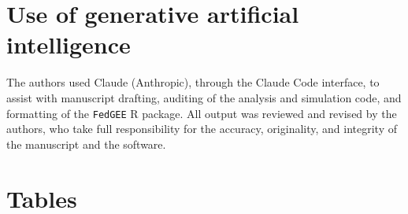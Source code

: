 \documentclass[12pt]{article}
\theoremstyle{remark}
\begin{document}
\section*{Use of generative artificial intelligence}
The authors used Claude (Anthropic), through the Claude Code interface, to assist
with manuscript drafting, auditing of the analysis and simulation code, and
formatting of the \texttt{FedGEE} R package. All output was reviewed and revised
by the authors, who take full responsibility for the accuracy, originality, and
integrity of the manuscript and the software.




\clearpage
\section*{Tables}
\end{document}
